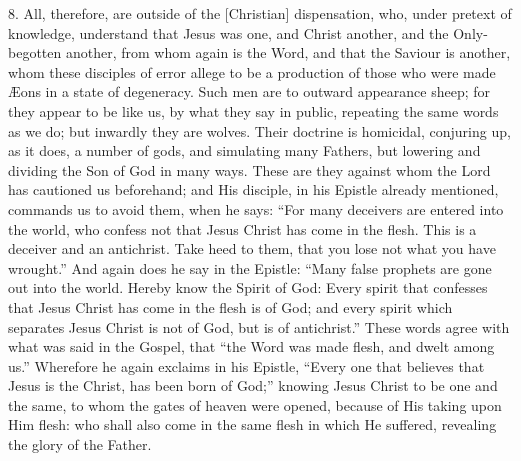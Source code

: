 \documentclass[9pt, twocolumn, oneside, a4paper]{memoir}
\newcommand{\gloss}[1]{%
    \marginpar[\RaggedLeft \footnotesize{#1}]{\RaggedRight \footnotesize{#1}}}
\begin{document}
8. All, therefore, are outside of the [Christian] dispensation, who, under pretext of knowledge, understand that Jesus was one, and Christ another, and the Only-begotten another, from whom again is the Word, and that the Saviour is another, whom these disciples of error allege to be a production of those who were made Æons in a state of degeneracy. Such men are to outward appearance sheep; for they appear to be like us, by what they say in public, repeating the same words as we do; but inwardly they are wolves. Their doctrine is homicidal, conjuring up, as it does, a number of gods, and simulating many Fathers, but lowering and dividing the Son of God in many ways. These are they against whom the Lord has cautioned us beforehand; and His disciple, in his Epistle already mentioned, commands us to avoid them, when he says: ``For many deceivers are entered into the world, who confess not that Jesus Christ has come in the flesh. This is a deceiver and an antichrist. Take heed to them, that you lose not what you have wrought.''  And again does he say in the Epistle: ``Many false prophets are gone out into the world. Hereby know the Spirit of God: Every spirit that confesses that Jesus Christ has come in the flesh is of God; and every spirit which separates Jesus Christ is not of God, but is of antichrist.''  These words agree with what was said in the Gospel, that ``the Word was made flesh, and dwelt among us.'' Wherefore he again exclaims in his Epistle, ``Every one that believes that Jesus is the Christ, has been born of God;'' \gloss{1 John 5:1} knowing Jesus Christ to be one and the same, to whom the gates of heaven were opened, because of His taking upon Him flesh: who shall also come in the same flesh in which He suffered, revealing the glory of the Father.
\end{document}
